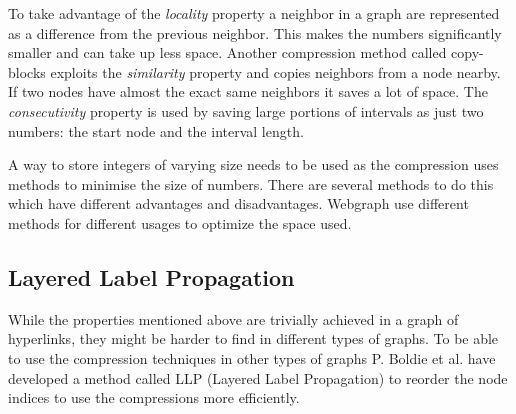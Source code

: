 To take advantage of the \emph{locality} property a neighbor in a graph are represented as a difference from the previous neighbor. This makes the numbers significantly smaller and can take up less space. Another compression method called copy-blocks exploits the \emph{similarity} property and copies neighbors from a node nearby. If two nodes have almost the exact same neighbors it saves a lot of space. The \emph{consecutivity} property is used by saving large portions of intervals as just two numbers: the start node and the interval length. \cite{webgraph-compression}

A way to store integers of varying size needs to be used as the compression uses methods to minimise the size of numbers. There are several methods to do this which have different advantages and disadvantages. Webgraph use different methods for different usages to optimize the space used. \cite{webgraph-compression}

\subsection{Layered Label Propagation}

While the properties mentioned above are trivially achieved in a graph of hyperlinks, they might be harder to find in different types of graphs. To be able to use the compression techniques in other types of graphs P. Boldie et al. have developed a method called LLP (Layered Label Propagation) to reorder the node indices to use the compressions more efficiently. \cite{llp} 


